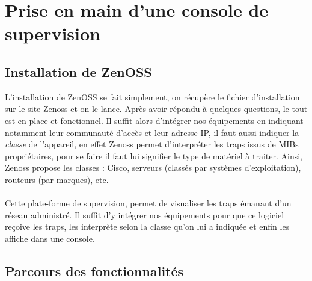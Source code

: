 \documentclass[12pt,a4paper,notitlepage]{article}
\begin{document}
\section{Prise en main d'une console de supervision}
\subsection{Installation de ZenOSS}
L'installation de ZenOSS se fait simplement, on récupère le fichier d'installation sur le site Zenoss et on le lance. Après avoir répondu à quelques questions, le tout est en place et fonctionnel. Il suffit alors d'intégrer nos équipements en indiquant notamment leur communauté d'accès et leur adresse IP, il faut aussi indiquer la \textit{classe} de l'appareil, en effet Zenoss permet d'interpréter les traps issus de MIBs propriétaires, pour se faire il faut lui signifier le type de matériel à traiter. Ainsi, Zenoss propose les classes : Cisco, serveurs (classés par systèmes d'exploitation), routeurs (par marques), etc.

\paragraph{}Cette plate-forme de supervision, permet de visualiser les traps émanant d'un réseau administré. Il suffit d'y intégrer nos équipements pour que ce logiciel reçoive les traps, les interprète selon la classe qu'on lui a indiquée et enfin les affiche dans une console.

\subsection{Parcours des fonctionnalités}


\end{document}
